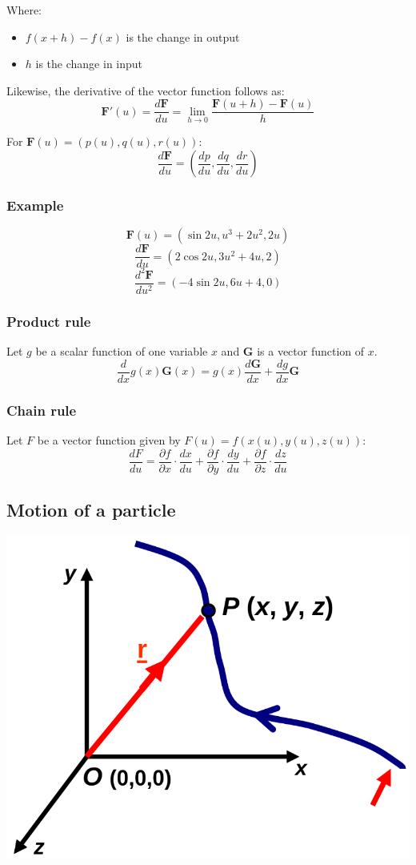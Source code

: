 \documentclass[11pt]{article}
\begin{document}
Where:
\begin{itemize}
\item \(f(x + h) - f(x)\) is the change in output
\item \(h\) is the change in input
\end{itemize}

Likewise, the derivative of the vector function follows as:
\[\boldsymbol{F}'(u) = \frac{d \boldsymbol{F}}{du} = \lim_{h \rightarrow 0} \frac{\boldsymbol{F}(u + h) - \boldsymbol{F}(u)}{h}\]

For \(\boldsymbol{F}(u) = (p(u), q(u), r(u))\):
\[\frac{d \boldsymbol{F}}{du} = \left(\frac{dp}{du}, \frac{dq}{du}, \frac{dr}{du} \right)\]
\subsubsection{Example}
\label{sec:orgaaac987}
\[\boldsymbol{F}(u) = (\sin 2u, u^3 + 2u^2, 2u)\]
\[\frac{d \boldsymbol{F}}{du} = (2 \cos 2u, 3u^2 + 4u, 2)\]
\[\frac{d^2 \boldsymbol{F}}{du^2} = (-4 \sin 2u, 6u + 4, 0)\]
\subsubsection{Product rule}
\label{sec:orgc785211}
Let \(g\) be a scalar function of one variable \(x\) and \(\boldsymbol{G}\) is a vector function of \(x\).
\[\frac{d}{dx} g(x) \boldsymbol{G}(x) = g(x) \frac{d \boldsymbol{G}}{dx} + \frac{dg}{dx} \boldsymbol{G}\]
\subsubsection{Chain rule}
\label{sec:org7a8b4ad}
Let \(F\) be a vector function given by \(F(u) = f(x(u), y(u), z(u))\):
\[\frac{dF}{du} = \frac{\partial f}{\partial x} \cdot \frac{dx}{du} + \frac{\partial f}{\partial y} \cdot \frac{dy}{du} + \frac{\partial f}{\partial z} \cdot \frac{dz}{du}\]
\subsection{Motion of a particle}
\label{sec:org374320b}
\begin{center}
\includegraphics[width=.9\linewidth]{./images/motion-of-a-particle.png}
\end{center}
\end{document}
